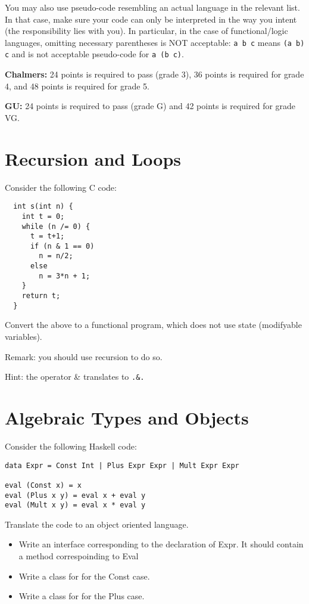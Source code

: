 \documentclass{article}
\begin{document}
You may also use pseudo-code resembling an actual language in the
relevant list. In that case, make sure your code can only be
interpreted in the way you intent (the responsibility lies with
you). In particular, in the case of functional/logic languages,
omitting necessary parentheses is NOT acceptable: \texttt{a b c} means
\texttt{(a b) c} and is not acceptable pseudo-code for \texttt{a (b
  c)}.


\textbf{Chalmers:}
24 points is required to pass (grade 3), 36 points is required for
grade 4, and 48 points is required for grade 5.

\textbf{GU:}
24 points is required to pass (grade G) and 42 points is
required for grade VG.

\section{Recursion and Loops}

Consider the following C code:
\begin{verbatim}
  int s(int n) {
    int t = 0;
    while (n /= 0) {
      t = t+1;
      if (n & 1 == 0)
        n = n/2;
      else
        n = 3*n + 1;
    }
    return t;
  }
\end{verbatim}

Convert the above to a functional program, which does not use state (modifyable variables).

Remark: you should use recursion to do so.

Hint: the operator \& translates to \texttt{.\&.}
\section{Algebraic Types and Objects}

Consider the following Haskell code:
\begin{verbatim}
data Expr = Const Int | Plus Expr Expr | Mult Expr Expr

eval (Const x) = x
eval (Plus x y) = eval x + eval y
eval (Mult x y) = eval x * eval y
\end{verbatim}

Translate the code to an object oriented language. 

\begin{itemize}
\item Write an interface corresponding to the declaration of Expr. It should contain a method correspoinding to Eval 
\item Write a class for for the Const case. 
\item Write a class for for the Plus case. 
\end{itemize}
\end{document}
